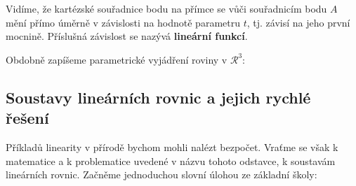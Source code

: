 {      %
        
      Vidíme, že kartézské souřadnice bodu na přímce se vůči souřadnicím bodu \(A\) mění přímo 
      úměrně v závislosti na hodnotě parametru \(t\), tj. závisí na jeho první mocnině. Příslušná 
      závislost se nazývá \textbf{lineární funkcí}.
      
      Obdobně zapíšeme parametrické vyjádření roviny v \(\mathcal{R}^3\):
      
      
    \subsection{Soustavy lineárních rovnic a jejich rychlé řešení}
      Příkladů linearity v přírodě bychom mohli nalézt bezpočet. Vraťme se však k matematice a k 
      problematice uvedené v názvu tohoto odstavce, k soustavám lineárních rovnic. Začněme 
      jednoduchou slovní úlohou ze základní školy:

      
      
}
